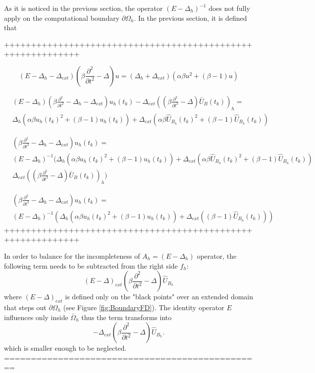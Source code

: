 \documentclass[11pt,a4paper,twoside]{article}
\begin{document}
As it is noticed in the previous section, the operator $(E - \Delta_h)^{-1}$ does not fully apply on the computational boundary $\partial \Omega_h$. In the previous section, it is defined that

++++++++++++++++++++++++++++++++++++++++++++++++++++++++++++

\begin{equation}
(E-\Delta_h -\Delta_{ext})(\beta \frac{ \partial^2 } { \partial t^2 } - \Delta) u =( \Delta_h + \Delta_{ext}) ( \alpha \beta u^2  + (\beta -1)u) 
\end{equation}

\begin{align}
&(E-\Delta_h)(\beta \frac{ \partial^2 } { \partial t^2 } - \Delta_h - \Delta_{ext}) u_h(t_k) - \Delta_{ext}((\beta \frac{ \partial^2 } { \partial t^2 } - \Delta)\bar U_B(t_k))_h = 
\\
&\Delta_h ( \alpha \beta u_h(t_k)^2  + (\beta -1)u_h(t_k)) +  \Delta_{ext} ( \alpha \beta\widehat U_{B_h}(t_k)^2  + (\beta -1)\widehat U_{B_h}(t_k))  
\end{align}

\begin{align}
&(\beta \frac{ \partial^2 } { \partial t^2 } - \Delta_h - \Delta_{ext}) u_h(t_k)  = 
\\
&(E-\Delta_h)^{-1} ( \Delta_h ( \alpha \beta u_h(t_k)^2  + (\beta -1)u_h(t_k)) +  \Delta_{ext} ( \alpha \beta\widehat U_{B_h}(t_k)^2  + (\beta -1)\widehat U_{B_h}(t_k))   \nonumber
\\
&\Delta_{ext}((\beta \frac{ \partial^2 } { \partial t^2 } - \Delta)\bar U_B(t_k))_h )
\end{align}

\begin{align}
&(\beta \frac{ \partial^2 } { \partial t^2 } - \Delta_h - \Delta_{ext}) u_h(t_k)  = 
\\
&(E-\Delta_h)^{-1} ( \Delta_h ( \alpha \beta u_h(t_k)^2  + (\beta -1)u_h(t_k)) +  \Delta_{ext} ( (\beta -1)\widehat U_{B_h}(t_k))  )
\end{align}
++++++++++++++++++++++++++++++++++++++++++++++++++++++++++++

In order to balance for the incompleteness of $A_h = (E-\Delta_h)$ operator, the following term needs to be subtracted from the right side $f_h$:
\begin{equation*}
(E-\Delta)_{ext}(\beta \frac{ \partial^2 } { \partial t^2 } - \Delta) \widehat U_{B_h}
\end{equation*}
where $(E-\Delta)_{ext}$ is defined only on the "black points" over an extended domain that steps out $\partial \Omega_h$ (see Figure \ref{fig:BoundaryFD}). The identity operator $E$ influences only inside $\bar \Omega_h$ thus the term transforms into
\begin{equation*}
-\Delta_{ext}(\beta \frac{ \partial^2 } { \partial t^2 } - \Delta) \widehat U_{B_h}.
\end{equation*}
which is smaller enough to be neglected.
================================================
\fi
\end{document}
